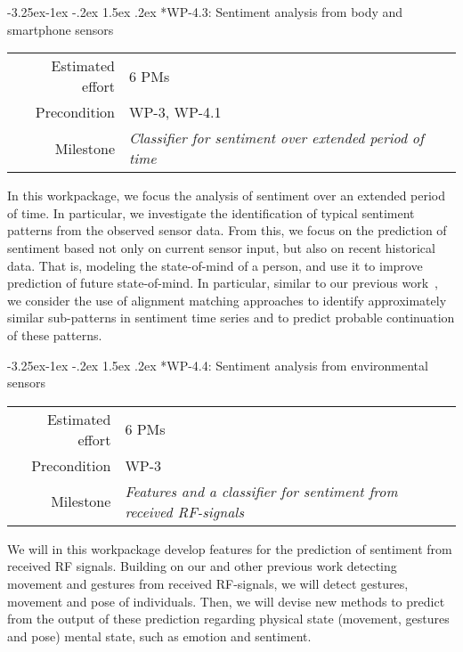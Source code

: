 \documentclass[12pt]{article}
\makeatletter
\newcommand{\kobyc}[1]{\begin{center}\fbox{\parbox{3in}{{\textcolor{green}{K: #1}}}}\end{center}}
\renewcommand\paragraph{\@startsection{paragraph}{4}{\z@}%
  {-3.25ex\@plus -1ex \@minus -.2ex}%
  {1.5ex \@plus .2ex}%
  {\normalfont\normalsize\bfseries}}
\makeatother
\begin{document}
\paragraph*{WP-4.3: Sentiment analysis from body and smartphone sensors}
\begin{tabular}{rl}
 Estimated effort& 6 PMs\\
 Precondition & WP-3, WP-4.1\\
 Milestone & \begin{minipage}[t]{12.2cm}
\textit{Classifier for sentiment over extended period of time}\vspace{.2cm}
             \end{minipage}
\end{tabular}

\noindent
In this workpackage, we focus the analysis of sentiment over an extended period of time. 
In particular, we investigate the identification of typical sentiment patterns from the observed sensor data.
From this, we focus on the prediction of sentiment based not only on current sensor input, but also on recent historical data. 
That is, modeling the state-of-mind of a person, and use it to improve prediction of future state-of-mind. 
In particular, similar to our previous work~\cite{4026,4027}, we consider the use of alignment matching approaches to identify approximately similar sub-patterns in sentiment time series and to predict probable continuation of these patterns.


\paragraph*{WP-4.4: Sentiment analysis from environmental sensors}
\begin{tabular}{rl}
 Estimated effort& 6 PMs\\
 Precondition & WP-3\\
 Milestone & \begin{minipage}[t]{12.2cm}
\textit{Features and a classifier for sentiment from received RF-signals}\vspace{.2cm}
             \end{minipage}
\end{tabular}

\noindent
We will in this workpackage develop features for the prediction of sentiment from received RF signals. 
Building on our and other previous work detecting movement and gestures from received RF-signals, we will detect gestures, movement and pose of individuals. 
Then, we will devise new methods to predict from the output of these prediction regarding physical state (movement, gestures and pose) mental state, such as emotion and sentiment. 
\end{document}
